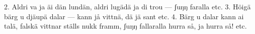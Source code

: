 2.  Aldri va ja äi dän lundän,
    aldri lugädä ja di trou —
    \qquad{}ʃuŋŋ faralla etc.
3.  Höigä bärg u djäupä dalar —
    kann jå vittnä, dä jä sant etc.
4.  Bärg u dalar kann ai talä,
    falskä vittnar ställs nukk framm,
    \qquad{}ʃuŋŋ fallaralla hurra så, ja hurra så! etc.
